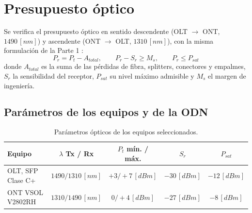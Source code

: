 \section{Presupuesto óptico}
\label{sec:presupuesto}
Se verifica el presupuesto óptico en sentido descendente (OLT $\rightarrow$ ONT, $1490 \, [nm]$) y ascendente (ONT $\rightarrow$ OLT, $1310 \, [nm]$), con la misma formulación de la Parte 1 \cite{libro_presupuesto, informe_p1}:
\begin{equation}
    P_r = P_t - A_{total}, \qquad P_r - S_r \geq M_s, \qquad P_r \leq P_{sat}
\end{equation}
donde $A_{total}$ es la suma de las pérdidas de fibra, splitters, conectores y empalmes, $S_r$ la sensibilidad del receptor, $P_{sat}$ su nivel máximo admisible y $M_s$ el margen de ingeniería.

\subsection{Parámetros de los equipos y de la ODN}
\label{sec:parametros_presupuesto}

\begin{table}[H]
    \centering
    \footnotesize
    \caption{Parámetros ópticos de los equipos seleccionados.}
    \label{tab:param_equipos}
    \begin{tabular}{|l|c|c|c|c|}
        \hline
        \textbf{Equipo} & \textbf{$\lambda$ Tx / Rx} & \textbf{$P_t$ mín. / máx.} & \textbf{$S_r$} & \textbf{$P_{sat}$} \\
        \hline
        OLT, SFP Clase C+ \cite{sfp_cplus} & $1490 / 1310 \, [nm]$ & $+3 / +7 \, [dBm]$ & $-30 \, [dBm]$ & $-12 \, [dBm]$ \\
        ONT VSOL V2802RH \cite{vsol_ont} & $1310 / 1490 \, [nm]$ & $0 / +4 \, [dBm]$ & $-27 \, [dBm]$ & $-8 \, [dBm]$ \\
        \hline
    \end{tabular}
\end{table}


